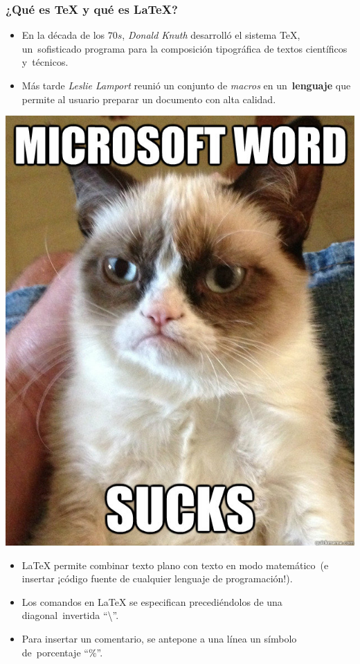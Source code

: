 \documentclass{beamer} %
\begin{document}
\begin{frame}
  \frametitle{¿Qué es \TeX{} y qué es \LaTeX?}
  \begin{itemize}
  \item En la década de los $70s$, \emph{Donald Knuth} desarrolló el sistema \TeX, un\
    sofisticado programa para la composición tipográfica de textos científicos y\
    técnicos.
  \item Más tarde \emph{Leslie Lamport} reunió un conjunto de \emph{macros} en un\
    \textbf{lenguaje} que permite al usuario preparar un documento con alta calidad.
  \end{itemize}
  \centering \includegraphics[scale=0.15]{wsucks}
\end{frame}

\begin{frame}
  \begin{itemize}
  \item \LaTeX{} permite combinar texto plano con texto en modo matemático\
    (e insertar ¡código fuente de cualquier lenguaje de programación!).
  \item Los comandos en \LaTeX{} se especifican precediéndolos de una diagonal\
    invertida ``\textbackslash''.
  \item Para insertar un comentario, se antepone a una línea un símbolo de\
    porcentaje ``$\%$''.
  \end{itemize}
\end{frame}
\end{document}

